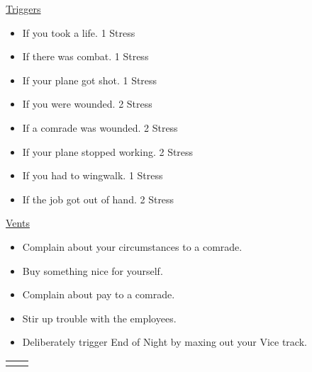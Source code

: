 \documentclass[twoside,headings,a4paper]{article}
\begin{document}
{    \begin{multicols*}{2}
        \raggedcolumns
        \uline{\Large\Kochfont Triggers\hfill}
        \begin{itemize}
            \item If you took a life. \dotfill{}1 Stress
            \item If there was combat. \dotfill{}1 Stress
            \item If your plane got shot. \dotfill{}1 Stress
            \item If you were wounded. \dotfill{}2 Stress
            \item If a comrade was wounded. \dotfill{}2 Stress
            \item If your plane stopped working. \dotfill{}2 Stress
            \item If you had to wingwalk. \dotfill{}1 Stress
            \item If the job got out of hand. \dotfill{}2 Stress
        \end{itemize}

        \columnbreak

        \uline{\Large\Kochfont Vents\hfill}
        \begin{itemize}
            \item Complain about your circumstances to a
                  comrade.
            \item Buy something nice for yourself.
            \item Complain about pay to a comrade.
            \item Stir up trouble with the employees.
            \item Deliberately trigger End of Night by
                  maxing out your Vice track.
        \end{itemize}
    \end{multicols*}
    \PlaybookRuleL
    \begin{NiceTabular}[rules/width=0.5mm]{X|X}
         &
\end{NiceTabular}}
\end{document}
